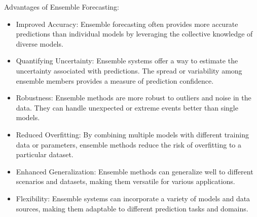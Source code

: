 \documentclass[../paper.tex]{subfiles}
\begin{document}
Advantages of Ensemble Forecasting:
\begin{itemize}
    \item Improved Accuracy:
    Ensemble forecasting often provides more accurate predictions than individual models
    by leveraging the collective knowledge of diverse models.

    \item Quantifying Uncertainty: Ensemble systems offer a way to estimate the uncertainty associated with predictions.
    The spread or variability among ensemble members provides a measure of prediction confidence.

    \item Robustness: Ensemble methods are more robust to outliers and noise in the data.
    They can handle unexpected or extreme events better than single models.

    \item Reduced Overfitting:
    By combining multiple models with different training data or parameters,
    ensemble methods reduce the risk of overfitting to a particular dataset.

    \item Enhanced Generalization: Ensemble methods can generalize well to different scenarios and datasets,
    making them versatile for various applications.

    \item Flexibility: Ensemble systems can incorporate a variety of models and data sources,
    making them adaptable to different prediction tasks and domains.
\end{itemize}
\end{document}
